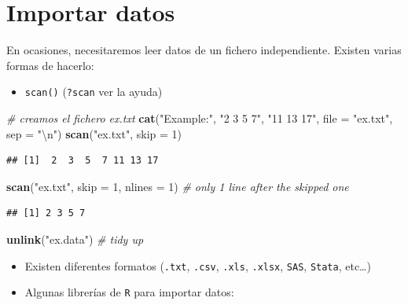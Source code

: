 \documentclass[]{book}
\newenvironment{Shaded}{\begin{snugshade}}{\end{snugshade}}
\newcommand{\KeywordTok}[1]{\textcolor[rgb]{0.13,0.29,0.53}{\textbf{#1}}}
\newcommand{\DataTypeTok}[1]{\textcolor[rgb]{0.13,0.29,0.53}{#1}}
\newcommand{\DecValTok}[1]{\textcolor[rgb]{0.00,0.00,0.81}{#1}}
\newcommand{\CharTok}[1]{\textcolor[rgb]{0.31,0.60,0.02}{#1}}
\newcommand{\StringTok}[1]{\textcolor[rgb]{0.31,0.60,0.02}{#1}}
\newcommand{\CommentTok}[1]{\textcolor[rgb]{0.56,0.35,0.01}{\textit{#1}}}
\newcommand{\NormalTok}[1]{#1}
\providecommand{\tightlist}{%
  \setlength{\itemsep}{0pt}\setlength{\parskip}{0pt}}
\begin{document}
\section{Importar datos}\label{importar-datos}

En ocasiones, necesitaremos leer datos de un fichero independiente.
Existen varias formas de hacerlo:

\begin{itemize}
\tightlist
\item
  \texttt{scan()} (\texttt{?scan} ver la ayuda)
\end{itemize}

\begin{Shaded}
\begin{Highlighting}[]
\CommentTok{# creamos el fichero ex.txt}
\KeywordTok{cat}\NormalTok{(}\StringTok{"Example:"}\NormalTok{, }\StringTok{"2 3 5 7"}\NormalTok{, }\StringTok{"11 13 17"}\NormalTok{, }\DataTypeTok{file =} \StringTok{"ex.txt"}\NormalTok{, }\DataTypeTok{sep =} \StringTok{"}\CharTok{\textbackslash{}n}\StringTok{"}\NormalTok{) }
\KeywordTok{scan}\NormalTok{(}\StringTok{"ex.txt"}\NormalTok{, }\DataTypeTok{skip =} \DecValTok{1}\NormalTok{)}
\end{Highlighting}
\end{Shaded}

\begin{verbatim}
## [1]  2  3  5  7 11 13 17
\end{verbatim}

\begin{Shaded}
\begin{Highlighting}[]
\KeywordTok{scan}\NormalTok{(}\StringTok{"ex.txt"}\NormalTok{, }\DataTypeTok{skip =} \DecValTok{1}\NormalTok{, }\DataTypeTok{nlines =} \DecValTok{1}\NormalTok{) }\CommentTok{# only 1 line after the skipped one}
\end{Highlighting}
\end{Shaded}

\begin{verbatim}
## [1] 2 3 5 7
\end{verbatim}

\begin{Shaded}
\begin{Highlighting}[]
\KeywordTok{unlink}\NormalTok{(}\StringTok{"ex.data"}\NormalTok{) }\CommentTok{# tidy up}
\end{Highlighting}
\end{Shaded}

\begin{itemize}
\item
  Existen diferentes formatos (\texttt{.txt}, \texttt{.csv},
  \texttt{.xls}, \texttt{.xlsx}, \texttt{SAS}, \texttt{Stata},
  etc\ldots{})
\item
  Algunas librerías de \texttt{R} para importar datos:
\end{itemize}
\end{document}
